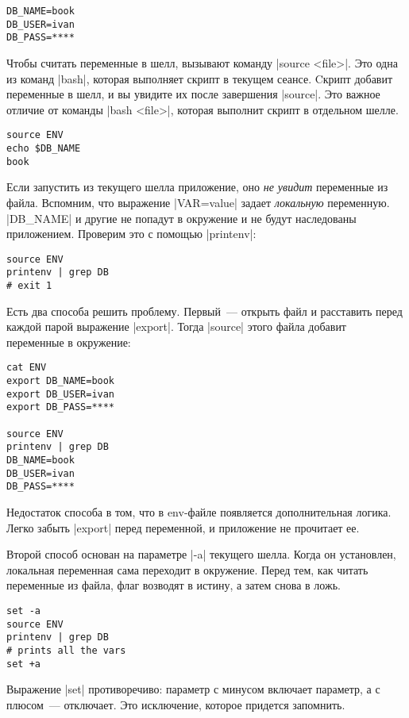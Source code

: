 \begin{verbatim}
DB_NAME=book
DB_USER=ivan
DB_PASS=****
\end{verbatim}

Чтобы считать переменные в шелл, вызывают команду \spverb|source <file>|. Это
одна из команд \spverb|bash|, которая выполняет скрипт в текущем сеансе. Cкрипт
добавит переменные в шелл, и вы увидите их после завершения \spverb|source|. Это
важное отличие от команды \spverb|bash <file>|, которая выполнит скрипт в
отдельном шелле.

\begin{verbatim}
source ENV
echo $DB_NAME
book
\end{verbatim}

Если запустить из текущего шелла приложение, оно \emph{не увидит} переменные из
файла. Вспомним, что выражение \spverb|VAR=value| задает \emph{локальную}
переменную. \spverb|DB_NAME| и другие не попадут в окружение и не будут
наследованы приложением. Проверим это с помощью \spverb|printenv|:

\begin{verbatim}
source ENV
printenv | grep DB
# exit 1
\end{verbatim}

Есть два способа решить проблему. Первый~--- открыть файл и расставить перед
каждой парой выражение \spverb|export|. Тогда \spverb|source| этого файла
добавит переменные в окружение:

\begin{verbatim}
cat ENV
export DB_NAME=book
export DB_USER=ivan
export DB_PASS=****

source ENV
printenv | grep DB
DB_NAME=book
DB_USER=ivan
DB_PASS=****
\end{verbatim}

Недостаток способа в том, что в env-файле появляется дополнительная
логика. Легко забыть \spverb|export| перед переменной, и приложение не прочитает
ее.

Второй способ основан на параметре \spverb|-a| текущего шелла. Когда он
установлен, локальная переменная сама переходит в окружение. Перед тем, как
читать переменные из файла, флаг возводят в истину, а затем снова в ложь.

\begin{verbatim}
set -a
source ENV
printenv | grep DB
# prints all the vars
set +a
\end{verbatim}

Выражение \spverb|set| противоречиво: параметр с минусом включает параметр, а с
плюсом~--- отключает. Это исключение, которое придется запомнить.

